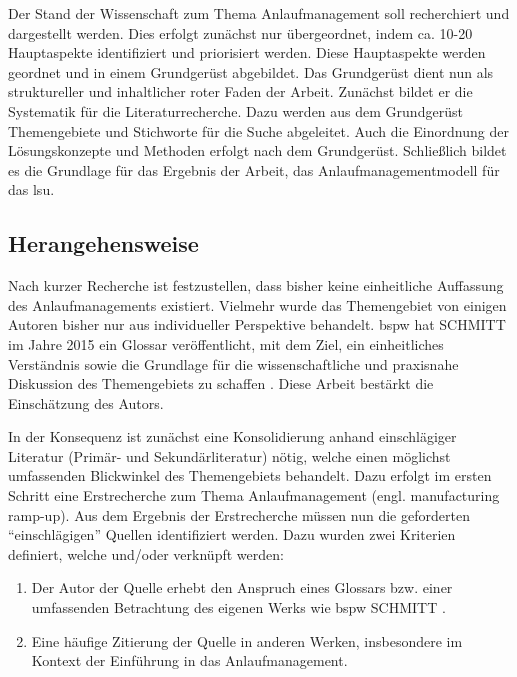 Der Stand der Wissenschaft zum Thema Anlaufmanagement soll recherchiert und dargestellt werden. Dies erfolgt zunächst nur übergeordnet, indem ca. 10-20 Hauptaspekte identifiziert und priorisiert werden. Diese Hauptaspekte werden geordnet und in einem Grundgerüst abgebildet. Das Grundgerüst dient nun als struktureller und inhaltlicher roter Faden der Arbeit. 
Zunächst bildet er die Systematik für die Literaturrecherche. Dazu werden aus dem Grundgerüst Themengebiete und Stichworte für die Suche abgeleitet. 
Auch die Einordnung der Lösungskonzepte und Methoden erfolgt nach dem Grundgerüst. 
Schließlich bildet es die Grundlage für das Ergebnis der Arbeit, das Anlaufmanagementmodell für das \gls{lsu}. 

\subsection*{Herangehensweise}\label{sec:herangehensweise_gg}

Nach kurzer Recherche ist festzustellen, dass bisher keine einheitliche Auffassung des Anlaufmanagements existiert. Vielmehr wurde das Themengebiet von einigen Autoren bisher nur aus individueller Perspektive behandelt. 
\Gls{bspw} hat SCHMITT im Jahre 2015 ein Glossar veröffentlicht, mit dem Ziel, ein einheitliches Verständnis sowie die Grundlage für die wissenschaftliche und praxisnahe Diskussion des Themengebiets zu schaffen \cite{Schmitt2015}. Diese Arbeit bestärkt die Einschätzung des Autors. 

In der Konsequenz ist zunächst eine Konsolidierung anhand einschlägiger Literatur (Primär- und Sekundärliteratur) nötig, welche einen möglichst umfassenden Blickwinkel des Themengebiets behandelt. Dazu erfolgt im ersten Schritt eine Erstrecherche zum Thema Anlaufmanagement (engl. manufacturing ramp-up). Aus dem Ergebnis der Erstrecherche müssen nun die geforderten ``einschlägigen'' Quellen identifiziert werden. Dazu wurden zwei Kriterien definiert, welche und/oder verknüpft werden: 
\begin{enumerate}
 \item Der Autor der Quelle erhebt den Anspruch eines Glossars bzw. einer umfassenden Betrachtung des eigenen Werks wie \gls{bspw} SCHMITT \cite{Schmitt2015}. 
 \item Eine häufige Zitierung der Quelle in anderen Werken, insbesondere im Kontext der Einführung in das Anlaufmanagement. 
\end{enumerate}

